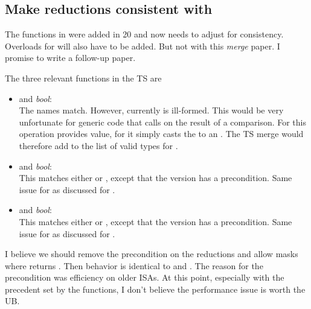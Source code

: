 \subsection{Make  reductions consistent with }
The functions in  were added in \CC{}20 \cite{P0553R4} and now
 needs to adjust for consistency.
Overloads for  will also have to be
added.
But not with this \emph{merge} paper.
I promise to write a follow-up paper.

The three relevant functions in the TS are
\begin{itemize}
  \item {} and \textit{bool}\code{)}:\\
    The names match.
    However, currently  is ill-formed.
    This would be very unfortunate for generic code that calls 
    on the result of a comparison.
    For  this operation provides value, for  it
    simply casts the  to an .
    The TS merge would therefore add  to the list of valid types for
    .

  \item {} and \textit{bool}\code{)}:\\
    This matches either  or , except that
    the  version has a precondition.
    Same issue for  as discussed for .

  \item {} and \textit{bool}\code{)}:\\
    This matches either  or , except that
    the  version has a precondition.
    Same issue for  as discussed for .
\end{itemize}

I believe we should remove the precondition on the  reductions
and allow masks where  returns .
Then behavior is identical to  and .
The reason for the precondition was efficiency on older ISAs.
At this point, especially with the precedent set by the 
functions, I don't believe the performance issue is worth the UB.

